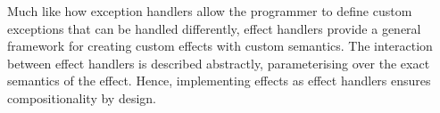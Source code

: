


Much like how exception handlers allow the programmer to define custom exceptions that can be handled differently, effect handlers provide a general framework for creating custom effects with custom semantics. The interaction between effect handlers is described abstractly, parameterising over the exact semantics of the effect. Hence, implementing effects as effect handlers ensures compositionality by design. 

